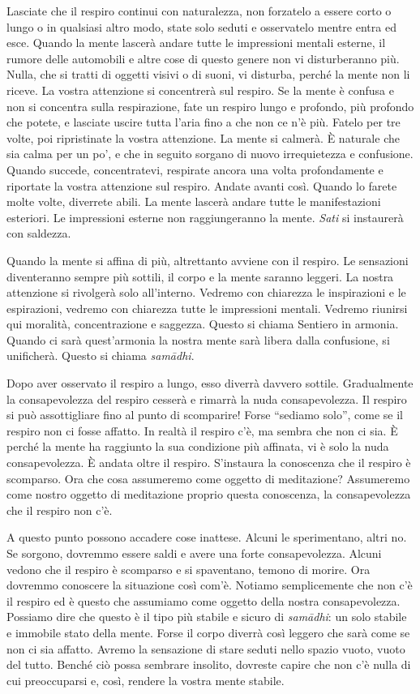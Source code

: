 Lasciate che il respiro continui con naturalezza, non forzatelo a essere
corto o lungo o in qualsiasi altro modo, state solo seduti e osservatelo
mentre entra ed esce. Quando la mente lascerà andare tutte le
impressioni mentali esterne, il rumore delle automobili e altre cose di
questo genere non vi disturberanno più. Nulla, che si tratti di oggetti
visivi o di suoni, vi disturba, perché la mente non li riceve. La vostra
attenzione si concentrerà sul respiro. Se la mente è confusa e non si
concentra sulla respirazione, fate un respiro lungo e profondo, più
profondo che potete, e lasciate uscire tutta l'aria fino a che non ce
n'è più. Fatelo per tre volte, poi ripristinate la vostra attenzione. La
mente si calmerà. È naturale che sia calma per un po', e che in seguito
sorgano di nuovo irrequietezza e confusione. Quando succede,
concentratevi, respirate ancora una volta profondamente e riportate la
vostra attenzione sul respiro. Andate avanti così. Quando lo farete
molte volte, diverrete abili. La mente lascerà andare tutte le
manifestazioni esteriori. Le impressioni esterne non raggiungeranno la
mente. \emph{Sati} si instaurerà con saldezza.

Quando la mente si affina di più, altrettanto avviene con il respiro. Le
sensazioni diventeranno sempre più sottili, il corpo e la mente saranno
leggeri. La nostra attenzione si rivolgerà solo all'interno. Vedremo con
chiarezza le inspirazioni e le espirazioni, vedremo con chiarezza tutte
le impressioni mentali. Vedremo riunirsi qui moralità, concentrazione e
saggezza. Questo si chiama Sentiero in armonia. Quando ci sarà
quest'armonia la nostra mente sarà libera dalla confusione, si
unificherà. Questo si chiama \emph{samādhi}.

Dopo aver osservato il respiro a lungo, esso diverrà davvero sottile.
Gradualmente la consapevolezza del respiro cesserà e rimarrà la nuda
consapevolezza. Il respiro si può assottigliare fino al punto di
scomparire! Forse ``sediamo solo'', come se il respiro non ci fosse
affatto. In realtà il respiro c'è, ma sembra che non ci sia. È perché la
mente ha raggiunto la sua condizione più affinata, vi è solo la nuda
consapevolezza. È andata oltre il respiro. S'instaura la conoscenza che
il respiro è scomparso. Ora che cosa assumeremo come oggetto di
meditazione? Assumeremo come nostro oggetto di meditazione proprio
questa conoscenza, la consapevolezza che il respiro non c'è.

A questo punto possono accadere cose inattese. Alcuni le sperimentano,
altri no. Se sorgono, dovremmo essere saldi e avere una forte
consapevolezza. Alcuni vedono che il respiro è scomparso e si
spaventano, temono di morire. Ora dovremmo conoscere la situazione così
com'è. Notiamo semplicemente che non c'è il respiro ed è questo che
assumiamo come oggetto della nostra consapevolezza. Possiamo dire che
questo è il tipo più stabile e sicuro di \emph{samādhi}: un solo stabile
e immobile stato della mente. Forse il corpo diverrà così leggero che
sarà come se non ci sia affatto. Avremo la sensazione di stare seduti
nello spazio vuoto, vuoto del tutto. Benché ciò possa sembrare insolito,
dovreste capire che non c'è nulla di cui preoccuparsi e, così, rendere
la vostra mente stabile.

